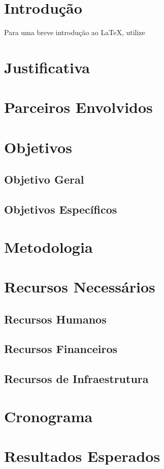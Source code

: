 \section{Introdução}
Para uma breve introdução ao \LaTeX, utilize \cite{de2000breve}

\section{Justificativa}


\section{Parceiros Envolvidos}


\section{Objetivos}
\subsection{Objetivo Geral}

\subsection{Objetivos Específicos}


\section{Metodologia}

\section{Recursos Necessários}
\subsection{Recursos Humanos}

\subsection{Recursos Financeiros}

\subsection{Recursos de Infraestrutura}

\section{Cronograma}


\section{Resultados Esperados}
